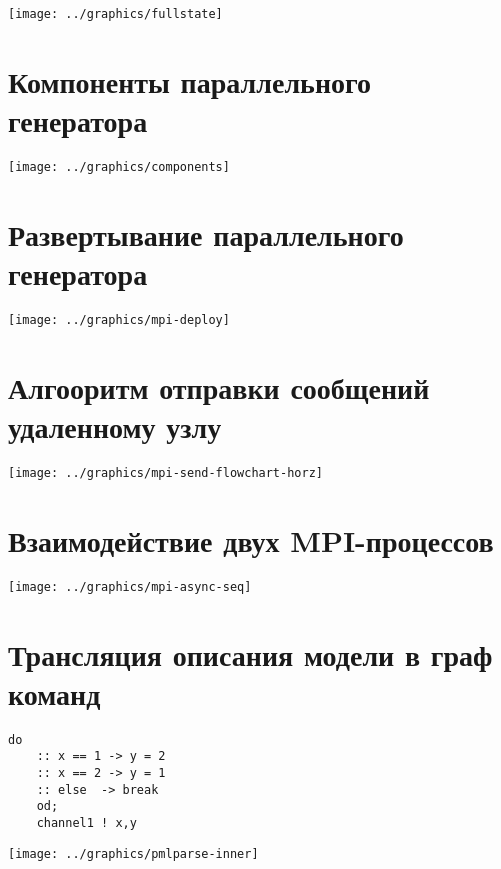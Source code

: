 \documentclass[12pt]{article}
\begin{document}
\begin{center}
  \texttt{[image: ../graphics/fullstate]}
\end{center}

\section{Компоненты параллельного генератора}
\label{sec:component-diag}

\begin{center}
  \texttt{[image: ../graphics/components]}
\end{center}

\section{Развертывание параллельного генератора}
\label{sec:deployment-diag}

\begin{center}
    \texttt{[image: ../graphics/mpi-deploy]}
\end{center}

\section{Алгооритм отправки сообщений удаленному узлу}
\label{sec:mpi-send-flowchart}

\begin{center}
  \texttt{[image: ../graphics/mpi-send-flowchart-horz]}
\end{center}

\section{Взаимодействие двух MPI-процессов}
\label{sec:mpi-sequence}

\begin{center}
  \texttt{[image: ../graphics/mpi-async-seq]}
\end{center}

\section{Трансляция описания модели в граф команд}
\label{sec:pmlparse}

\begin{minipage}[m]{0.35\linewidth}
  \begin{lstlisting}[language=Promela,style=simplecode,numbers=none]
    do
    :: x == 1 -> y = 2
    :: x == 2 -> y = 1
    :: else  -> break
    od;
    channel1 ! x,y
  \end{lstlisting}
\end{minipage}
\begin{minipage}[m]{0.75\linewidth}
  \texttt{[image: ../graphics/pmlparse-inner]}
\end{minipage}
\end{document}
